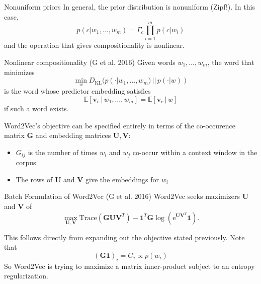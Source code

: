 \documentclass[xcolor=x11names,compress,ignorenonframetext,10pt]{beamer}
\renewcommand{\(}{\begin{columns}}
\renewcommand{\)}{\end{columns}}
\newcommand{\<}[1]{\begin{column}{#1}}
\renewcommand{\>}{\end{column}}
\def\refcolor{DodgerBlue4}
\newcommand{\refer}[1]{({\color{\refcolor}#1})}
\begin{document}
\begin{frame}{Nonuniform priors}
  In general, the prior distribution is nonuniform (Zipf!). In this case,
  \[
    p( c | w_1, \ldots, w_m) = \Gamma_c \prod_{i=1}^m p(c | w_i)
  \]
  and the operation that gives compositionality is nonlinear.

  \begin{block}{Nonlinear compositionality \refer{G et al. 2016}}
  Given words $w_1, \ldots, w_m$, the word that minimizes 
    \[
      \min_{w} D_{\textrm{KL}}(p (\cdot | w_1, \ldots, w_m)\, ||\, p(\cdot | w))
    \]
    is the word whose predictor embedding satisfies
    \[
      \mathbb{E}[\mathbf{v}_c \,|\, w_1, \ldots, w_m] = \mathbb{E}[\mathbf{v}_c \,|\, w]
    \]
    if such a word exists.
  \end{block}
\end{frame}
\begin{frame}
  Word2Vec's objective can be specified entirely in terms of the co-occurence matrix $\mathbf{G}$ and embedding matrices $\mathbf{U}, \mathbf{V}$:
  \begin{itemize}
    \item $G_{ij}$ is the number of times $w_i$ and $w_j$ co-occur within a context window in the corpus
    \item The rows of $\mathbf{U}$ and $\mathbf{V}$ give the embeddings for $w_i$
  \end{itemize}

  \begin{block}{Batch Formulation of Word2Vec \refer{G et al. 2016}}
    Word2Vec seeks maximizers $\mathbf{U}$ and $\mathbf{V}$ of 
    \[
    \max_{\mathbf{U}, \mathbf{V}} \textrm{Trace}(\mathbf{G} \mathbf{U} \mathbf{V}^T) - \mathbf{1}^T \mathbf{G} \log( \mathrm{e}^{\mathbf{U} \mathbf{V}^T} \mathbf{1}).
  \]
  \end{block}

  This follows directly from expanding out the objective stated previously. Note that
  \[ (\mathbf{G}\mathbf{1})_i = G_i \propto p(w_i) \]
  So Word2Vec is trying to maximize a matrix inner-product subject to an entropy regularization.
\end{frame}
\end{document}
